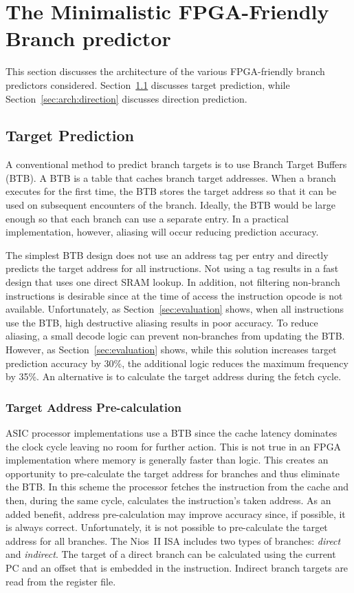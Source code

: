 \chapter{The Minimalistic FPGA-Friendly Branch predictor}
This section discusses the architecture of the various FPGA-friendly branch predictors considered. 
Section~\ref{sec:arch:target} discusses target prediction, while Section~\ref{sec:arch:direction} discusses direction prediction.

\section{Target Prediction}
\label{sec:arch:target}
A conventional method to predict branch targets is to use Branch Target Buffers (BTB). A BTB is a table that caches branch target addresses. When a branch executes for the first time, the BTB stores the target address so that it can be used on subsequent encounters of the branch. Ideally, the BTB would be large enough so that each branch can use a separate entry. In a practical implementation, however, aliasing will occur reducing prediction accuracy.  

The simplest BTB design does not use an address tag per entry and directly predicts the target address for all instructions. Not using a tag results in a fast design that uses one direct SRAM lookup. In addition, not filtering non-branch instructions is desirable since at the time of access the instruction opcode is not available. Unfortunately, as Section~\ref{sec:evaluation} shows, when all instructions use the BTB, high destructive aliasing results in poor accuracy. To reduce aliasing, a small decode logic can prevent non-branches from updating the BTB. However, as Section~\ref{sec:evaluation} shows, while this solution increases target prediction accuracy by 30\%, the additional logic reduces the maximum frequency by 35\%. An alternative is to calculate the target address during the fetch cycle.

\subsection{Target Address Pre-calculation}
\label{sec:arch:addrprecalc}

ASIC processor implementations use a BTB since the cache latency dominates the clock cycle leaving no room for further action. This is not true in an FPGA implementation where memory is generally faster than logic. This creates an opportunity to pre-calculate the target address for branches and thus eliminate the BTB. In this scheme the processor fetches the instruction from the cache and then, during the same cycle, calculates the instruction's taken address. As an added benefit, address pre-calculation  may improve accuracy since, if possible, it is always correct. Unfortunately, it is not possible to pre-calculate the target address for all branches. The Nios~II ISA includes two types of branches: \textit{direct} and \textit{indirect}. The target of a direct branch can be calculated using the current PC and an offset that is embedded in the instruction. Indirect branch targets are read from the register file.  

